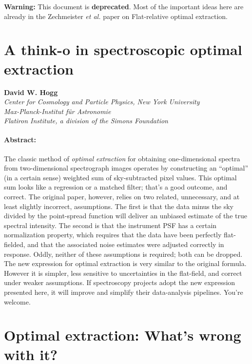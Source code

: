 \documentclass[12pt, letterpaper]{article}
\begin{document}
\sloppy\sloppypar\raggedbottom\frenchspacing

\noindent
\textbf{Warning:}
This document is \textbf{deprecated}.
Most of the important ideas here are already in the Zechmeister \textsl{et al.}
paper on Flat-relative optimal extraction.

\section*{A think-o in spectroscopic optimal extraction}

\noindent
\textbf{David W. Hogg}\\
{\footnotesize
\textsl{Center for Cosmology and Particle Physics, New York University}\\
\textsl{Max-Planck-Institut f\"ur Astronomie}\\
\textsl{Flatiron Institute, a division of the Simons Foundation}
}

\paragraph{Abstract:}
The classic method of \emph{optimal extraction} for obtaining
one-dimensional spectra from two-dimensional spectrograph images
operates by constructing an ``optimal'' (in a certain sense) weighted
sum of sky-subtracted pixel values.
This optimal sum looks like a regression or a matched filter;
that's a good outcome, and correct.
The original paper, however, relies on two related, unnecessary, and
at least slightly incorrect, assumptions.
The first is that the data minus the sky divided by the point-spread
function will deliver an unbiased estimate of the true spectral
intensity.
The second is that the instrument PSF has a certain normalization
property, which requires that the data have been perfectly
flat-fielded, and that the associated noise estimates were adjusted
correctly in response.
Oddly, neither of these assumptions is required; both can be dropped.
The new expression for optimal extraction is very similar to the
original formula.
However it is simpler, less sensitive to uncertainties in the
flat-field, and correct under weaker assumptions.
If spectroscopy projects adopt the new expression presented here, it
will improve and simplify their data-analysis pipelines.
You're welcome.

\section{Optimal extraction: What's wrong with it?}
\end{document}
